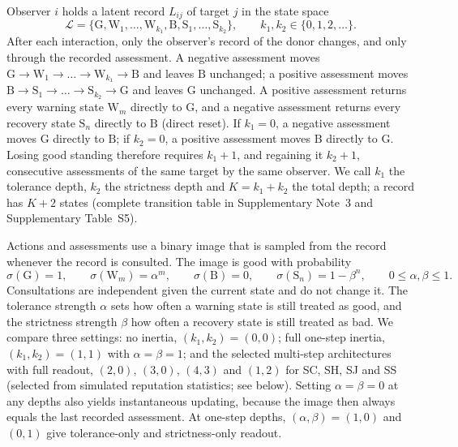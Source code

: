 Observer $i$ holds a latent record $L_{ij}$ of target $j$ in the state space
\begin{equation}
\mathcal L=\{\mathrm G,\mathrm W_1,\dots,\mathrm W_{k_1},\mathrm B,
\mathrm S_1,\dots,\mathrm S_{k_2}\},\qquad k_1,k_2\in\{0,1,2,\dots\}.
\label{eq:m-states}
\end{equation}
After each interaction, only the observer's record of the donor changes, and
only through the recorded assessment. A negative assessment moves
$\mathrm G\to\mathrm W_1\to\dots\to\mathrm W_{k_1}\to\mathrm B$ and leaves
$\mathrm B$ unchanged; a positive assessment moves
$\mathrm B\to\mathrm S_1\to\dots\to\mathrm S_{k_2}\to\mathrm G$ and leaves
$\mathrm G$ unchanged. A positive assessment returns every warning state
$\mathrm W_m$ directly to $\mathrm G$, and a negative assessment returns every
recovery state $\mathrm S_n$ directly to $\mathrm B$ (direct reset). If
$k_1=0$, a negative assessment moves $\mathrm G$ directly to $\mathrm B$; if
$k_2=0$, a positive assessment moves $\mathrm B$ directly to $\mathrm G$.
Losing good standing therefore requires $k_1+1$, and regaining it $k_2+1$,
consecutive assessments of the same target by the same observer. We call $k_1$
the tolerance depth, $k_2$ the strictness depth and $K=k_1+k_2$ the total
depth; a record has $K+2$ states (complete transition table in Supplementary Note~3 and
Supplementary Table~S5).

Actions and assessments use a binary image that is sampled from the record
whenever the record is consulted. The image is good with probability
\begin{equation}
\sigma(\mathrm G)=1,\qquad \sigma(\mathrm W_m)=\alpha^m,\qquad
\sigma(\mathrm B)=0,\qquad \sigma(\mathrm S_n)=1-\beta^n,
\qquad 0\le\alpha,\beta\le1 .
\label{eq:m-readout}
\end{equation}
Consultations are independent given the current state and do not change it.
The tolerance strength $\alpha$ sets how often a warning state is still treated
as good, and the strictness strength $\beta$ how often a recovery state is
still treated as bad. We compare three settings: no inertia,
$(k_1,k_2)=(0,0)$; full one-step inertia, $(k_1,k_2)=(1,1)$ with
$\alpha=\beta=1$; and the selected multi-step architectures with full readout,
$(2,0)$, $(3,0)$, $(4,3)$ and $(1,2)$ for SC, SH, SJ and SS (selected from
simulated reputation statistics; see below). Setting $\alpha=\beta=0$ at any
depths also yields instantaneous updating, because the image then always
equals the last recorded assessment. At one-step depths, $(\alpha,\beta)=(1,0)$
and $(0,1)$ give tolerance-only and strictness-only readout.

